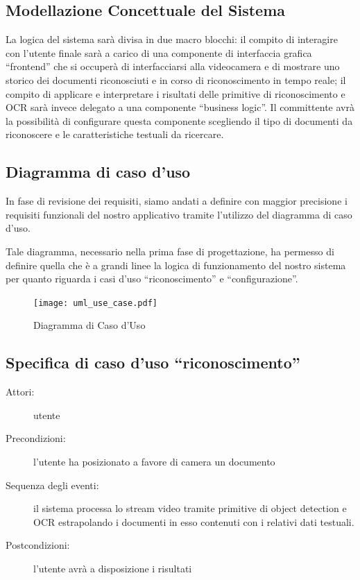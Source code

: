 \documentclass[12pt,a4paper]{article}
\begin{document}
\subsection{Modellazione Concettuale del Sistema}

La logica del sistema sarà divisa in due macro blocchi: il compito di
interagire con l'utente finale sarà a carico di una componente di
interfaccia grafica ``frontend'' che si occuperà di interfacciarsi alla
videocamera e di mostrare uno storico dei documenti riconosciuti e in
corso di riconoscimento in tempo reale; il compito di applicare e
interpretare i risultati delle primitive di riconoscimento e OCR sarà
invece delegato a una componente ``business logic''. Il committente
avrà la possibilità di configurare questa componente scegliendo il tipo
di documenti da riconoscere e le caratteristiche testuali da ricercare.

\subsection{Diagramma di caso d'uso}

In fase di revisione dei requisiti, siamo andati a definire con maggior
precisione i requisiti funzionali del nostro applicativo tramite
l'utilizzo del diagramma di caso d'uso.

Tale diagramma, necessario nella prima fase di progettazione, ha
permesso di definire quella che è a grandi linee la logica di
funzionamento del nostro
sistema per quanto riguarda i casi d'uso ``riconoscimento'' e ``configurazione''.

\begin{figure}[H]
    \caption{Diagramma di Caso d'Uso}
    \centering
    \texttt{[image: uml\_use\_case.pdf]}
\end{figure}

\subsection{Specifica di caso d'uso ``riconoscimento''}
\begin{description}
    \item[Attori:] utente
    \item[Precondizioni:] l'utente ha posizionato a favore di camera un
        documento
    \item[Sequenza degli eventi:] il sistema processa lo stream video
        tramite primitive di object detection e OCR estrapolando i
        documenti in esso contenuti con i relativi dati testuali.
    \item[Postcondizioni:] l'utente avrà a disposizione i risultati
\end{description}
\end{document}
